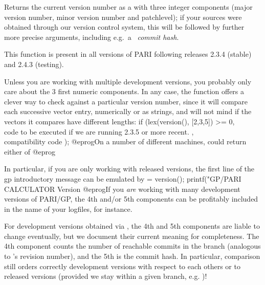 {\label{se:version}
Returns the current version number as a  with three integer
components (major version number, minor version number and patchlevel);
if your sources were obtained through our version control system, this will
be followed by further more precise arguments, including
e.g.~a~ \emph{commit hash}.

This function is present in all versions of PARI following releases 2.3.4
(stable) and 2.4.3 (testing).

Unless you are working with multiple development versions, you probably only
care about the 3 first numeric components. In any case, the  function
offers a clever way to check against a particular version number, since it will
compare each successive vector entry, numerically or as strings, and will not
mind if the vectors it compares have different lengths:
\bprog
   if (lex(version(), [2,3,5]) >= 0,
     \\ code to be executed if we are running 2.3.5 or more recent.
   ,
     \\ compatibility code
   );
@eprog\noindent On a number of different machines,  could return either of
\bprog
@eprog

In particular, if you are only working with released versions, the first
line of the gp introductory message can be emulated by
\bprog
   [M,m,p] = version();
   printf("GP/PARI CALCULATOR Version %
 @eprog\noindent If you \emph{are} working with many development versions of
 PARI/GP, the 4th and/or 5th components can be profitably included in the
 name of your logfiles, for instance.

  For development versions obtained via ,
 the 4th and 5th components are liable to change eventually, but we document
 their current meaning for completeness. The 4th component counts the number
 of reachable commits in the branch (analogous to 's revision
 number), and the 5th is the  commit hash. In particular, 
 comparison still orders correctly development versions with respect to each
 others or to released versions (provided we stay within a given branch,
 e.g. )!

}
